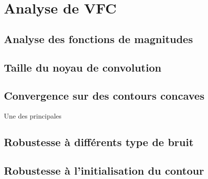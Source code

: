 
\section{Analyse de VFC}
\subsection{Analyse des fonctions de magnitudes}
\subsection{Taille du noyau de convolution}
\subsection{Convergence sur des contours concaves}
Une des principales 
\subsection{Robustesse à différents type de bruit}
\subsection{Robustesse à l'initialisation du contour}
